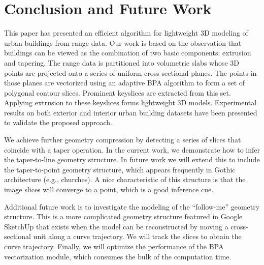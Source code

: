 \documentclass[review]{acmsiggraph}       %
\begin{document}
\section{Conclusion and Future Work}

This paper has presented an efficient algorithm for lightweight 3D modeling
of urban buildings from range data.
Our work is based on the observation that buildings can be viewed as the
combination of two basic components: extrusion and tapering.
The range data is partitioned into volumetric slabs whose 3D points are
projected onto a series of uniform cross-sectional planes.
The points in those planes are vectorized using an adaptive BPA algorithm
to form a set of polygonal contour slices.
Prominent keyslices are extracted from this set.
Applying extrusion to these keyslices forms lightweight 3D models.
Experimental results on both exterior and interior urban building datasets
have been presented to validate the proposed approach.

We achieve further geometry compression by detecting a series of
slices that coincide with a taper operation.
In the current work, we demonstrate how to infer the taper-to-line
geometry structure.
In future work we will extend this to include the taper-to-point geometry
structure, which appears frequently in Gothic architecture (e.g., churches).
A nice characteristic of this structure is that the image slices will converge
to a point, which is a good inference cue.

Additional future work is to investigate the modeling of the ``follow-me''
geometry structure.
This is a more complicated geometry structure featured in Google SketchUp
that exists when the model can be reconstructed by moving a cross-sectional
unit along a curve trajectory.
We will track the slices to obtain the curve trajectory.
Finally, we will optimize the performance of the BPA vectorization module,
which consumes the bulk of the computation time.



\end{document}
